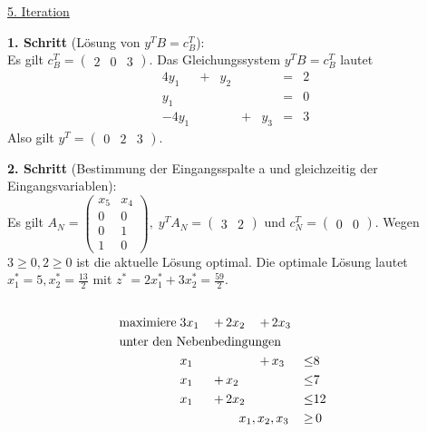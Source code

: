 \documentclass[10pt,a4paper,oneside,ngerman,numbers=noenddot]{scrartcl}
\begin{document}
		\underline{5. Iteration}
		
		\textbf{1. Schritt} (Lösung von $y^{T}B = c_{B}^{T}$):\\
		Es gilt $c_{B}^{T} = \begin{pmatrix} 2 & 0 & 3 \end{pmatrix}$. Das Gleichungssystem $y^{T}B = c_{B}^{T}$ lautet
		\begin{alignat*}{4}
			y_{1} &+& y_{2} && &=& 2 \\
			y_{1} && && &=& 0 \\
			-4y_{1} && &+& y_{3} &=& 3
		\end{alignat*}
		Also gilt $y^{T} = \begin{pmatrix} 0 & 2 & 3 \end{pmatrix}$.
		
		\textbf{2. Schritt} (Bestimmung der Eingangsspalte a und gleichzeitig der Eingangsvariablen):\\
		Es gilt $A_{N} = \begin{pmatrix} x_{5} & x_{4} \\ 0 & 0 \\ 0 & 1 \\ 1 & 0 \end{pmatrix},\; y^{T}A_{N} = \begin{pmatrix} 3 & 2 \end{pmatrix}$ und $c_{N}^{T} = \begin{pmatrix} 0 & 0 \end{pmatrix}$. Wegen $3 \geq 0, 2 \geq 0$ ist die aktuelle Lösung optimal. Die optimale Lösung lautet $x_{1}^{*} = 5, x_{2}^{*} = \frac{13}{2}$ mit $z^{*} = 2x_{1}^{*} + 3x_{2}^{*} = \frac{59}{2}$.
	\subsection{} %
		\begin{alignat*}{4}
			\text{maximiere}\; & 3x_{1} \,&+&\, 2x_{2} \,&+&\, 2x_{3} && \\
			\multicolumn{8}{l}{\text{unter den Nebenbedingungen}} && \\
			\;& x_{1} \,&&\, \,&+&\, x_{3} \,&\leq & 8 \\
			\;& x_{1} \,&+&\, x_{2} \,&&\, \,&\leq & 7 \\
			\;& x_{1} \,&+&\, 2x_{2} \,&&\, \,&\leq & 12 \\			
			\multicolumn{6}{r}{$x_{1}, x_{2}, x_{3}$} \,&\geq &\, 0
		\end{alignat*}
		
\end{document}
